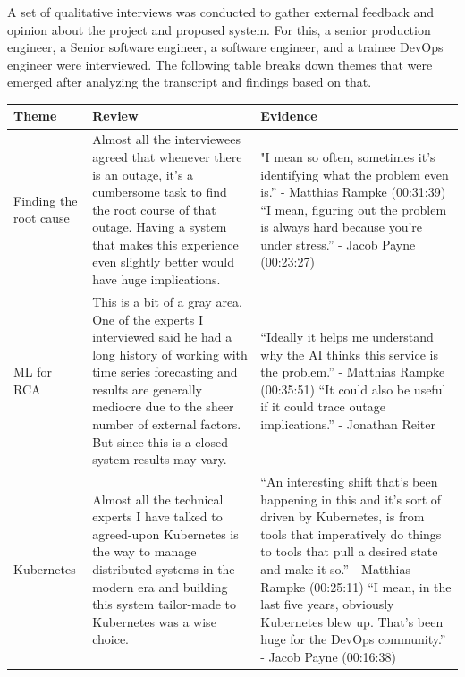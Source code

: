 A set of qualitative interviews was conducted to gather external feedback and opinion about the project and proposed system. For this, a senior production engineer, a Senior software engineer, a software engineer, and a trainee DevOps engineer were interviewed. The following table breaks down themes that were emerged after analyzing the transcript and findings based on that.
\newpage
\begin{longtable}{|p{30mm}|p{61mm}|p{60mm}|}
    \hline
    \textbf{Theme} &
    \textbf{Review} &
    \textbf{Evidence} \\ \hline
    
    Finding the root cause &
    Almost all the interviewees agreed that whenever there is an outage, it’s a cumbersome task to find the root course of that outage. Having a system that makes this experience even slightly better would have huge implications. &
    "I mean so often, sometimes it's identifying what the problem even is.” - Matthias Rampke (00:31:39)
    \newline
    \newline
    “I mean, figuring out the problem is always hard because you're under stress.” - Jacob Payne (00:23:27)
    \\ \hline

    
    
    ML for RCA &
    This is a bit of a gray area. One of the experts I interviewed said he had a long history of working with time series forecasting and results are generally mediocre due to the sheer number of external factors. But since this is a closed system results may vary. &
    “Ideally it helps me understand why the AI thinks this service is the problem.” \newline- Matthias Rampke (00:35:51)
    \newline
    \newline
    “It could also be useful if it could trace outage implications.” \newline- Jonathan Reiter \\ \hline
    
    
    Kubernetes &
    Almost all the technical experts I have talked to agreed-upon Kubernetes is the way to manage distributed systems in the modern era and building this system tailor-made to Kubernetes was a wise choice. &
    “An interesting shift that's been happening in this and it's sort of driven by Kubernetes, is from tools that imperatively do things to tools that pull a desired state and make it so.” \newline- Matthias Rampke (00:25:11)
    \newline
    “I mean, in the last five years, obviously Kubernetes blew up. That's been huge for the DevOps community.” \newline- Jacob Payne (00:16:38) \\ \hline
        

\end{longtable}
